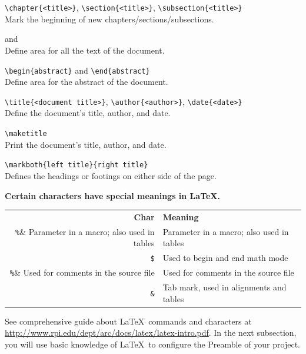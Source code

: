 \par
\verb|\chapter{<title>}|, \verb|\section{<title>}|, \verb|\subsection{<title>}|\\
Mark the beginning of new chapters/sections/subsections.
\par
\verb|| and \verb||\\
Define area for all the text of the document.
\par
\verb|\begin{abstract}| and \verb|\end{abstract}|\\
Define area for the abstract of the document.
\par
\verb|\title{<document title>}|, \verb|\author{<author>}|, \verb|\date{<date>}|\\
Define the document's title, author, and date.
\par
\verb|\maketitle|\\
Print the document's title, author, and date.
\par
\verb|\markboth{left title}{right title}|\\
Defines the headings or footings on either side of the page.
\par
{\Large\textbf{Certain characters have special meanings in \LaTeX.}}
\par
\begin{tabular}{r|l}
\textbf{Char} & \textbf{Meaning} \\
\verb|%|& Parameter in a macro; also used in tables \\ 
\verb|$|& Used to begin and end math mode \\
\verb|%|& Used for comments in the source file \\
\verb|&|& Tab mark, used in alignments and tables \\
\end{tabular}
\par
See comprehensive guide about \LaTeX\ commands and characters at \url{http://www.rpi.edu/dept/arc/docs/latex/latex-intro.pdf}. In the next subsection, you will use basic knowledge of \LaTeX\ to configure the Preamble of your project.

